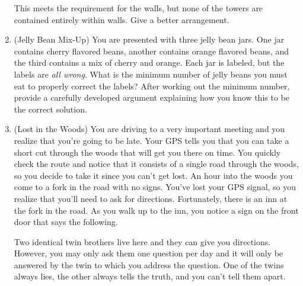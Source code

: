 \documentclass[12 pt]{article}
\theoremstyle{definition}
\theoremstyle{plain}
\theoremstyle{mytheorem}
\theoremstyle{myexample}
\theoremstyle{mydefinition}
\begin{document}
\begin{enumerate}
%
%
This meets the requirement for the walls, but none of the towers are contained entirely within walls.  Give a better arrangement.

\item (Jelly Bean Mix-Up)  You are presented with three jelly bean jars.  One jar contains cherry flavored beans, another contains orange flavored beans, and the third contains a mix of cherry and orange.  Each jar is labeled, but the labels are \textit{all wrong}.  What is the minimum number of jelly beans you must eat to properly correct the labels?  After working out the minimum number, provide a carefully developed argument explaining how you know this to be the correct solution.

\item (Lost in the Woods)  You are driving to a very important meeting and you realize that you're going to be late.  Your GPS tells you that you can take a short cut through the woods that will get you there on time.  You quickly check the route and notice that it consists of a single road through the woods, so you decide to take it since you can't get lost.  An hour into the woods you come to a fork in the road with no signs.  You've lost your GPS signal, so you realize that you'll need to ask for directions.  Fortunately, there is an inn at the fork in the road.  As you walk up to the inn, you notice a sign on the front door that says the following.
	\begin{center}\parbox{5in}{Two identical twin brothers live here and they can give you directions.  However, you may only ask them one question per day and it will only be answered by the twin to which you address the question.  One of the twins always lies, the other always tells the truth, and you can't tell them apart.
	}


\end{center}
\end{enumerate}
\end{document}
